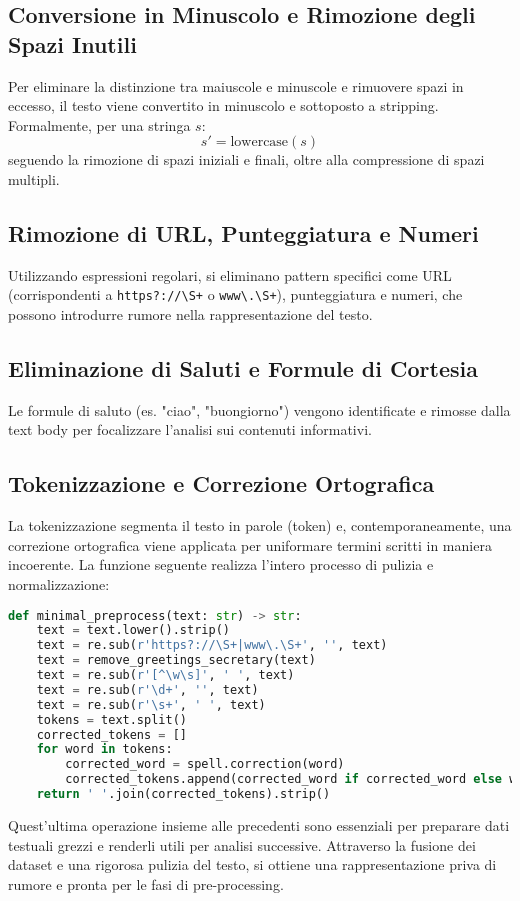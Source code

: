 \subsection{Conversione in Minuscolo e Rimozione degli Spazi Inutili}
Per eliminare la distinzione tra maiuscole e minuscole e rimuovere spazi in eccesso, il testo viene convertito in minuscolo e sottoposto a stripping. Formalmente, per una stringa \( s \):
\[
s' = \text{lowercase}(s)
\]
seguendo la rimozione di spazi iniziali e finali, oltre alla compressione di spazi multipli.

\subsection{Rimozione di URL, Punteggiatura e Numeri}
Utilizzando espressioni regolari, si eliminano pattern specifici come URL (corrispondenti a \verb|https?://\S+| o \verb|www\.\S+|), punteggiatura e numeri, che possono introdurre rumore nella rappresentazione del testo.

\subsection{Eliminazione di Saluti e Formule di Cortesia}
Le formule di saluto (es. "ciao", "buongiorno") vengono identificate e rimosse dalla text body per focalizzare l'analisi sui contenuti informativi.

\subsection{Tokenizzazione e Correzione Ortografica}
La tokenizzazione segmenta il testo in parole (token) e, contemporaneamente, una correzione ortografica viene applicata per uniformare termini scritti in maniera incoerente. La funzione seguente realizza l'intero processo di pulizia e normalizzazione:

\begin{lstlisting}[language=Python,caption={Funzione minimal\_preprocess}]
def minimal_preprocess(text: str) -> str:
    text = text.lower().strip()
    text = re.sub(r'https?://\S+|www\.\S+', '', text)
    text = remove_greetings_secretary(text)
    text = re.sub(r'[^\w\s]', ' ', text)
    text = re.sub(r'\d+', '', text)
    text = re.sub(r'\s+', ' ', text)
    tokens = text.split()
    corrected_tokens = []
    for word in tokens:
        corrected_word = spell.correction(word)
        corrected_tokens.append(corrected_word if corrected_word else word)
    return ' '.join(corrected_tokens).strip()
\end{lstlisting}

Quest'ultima operazione insieme alle precedenti sono essenziali per preparare dati testuali grezzi e renderli utili per analisi successive. Attraverso la fusione dei dataset e una rigorosa pulizia del testo, si ottiene una rappresentazione priva di rumore e pronta per le fasi di pre-processing.